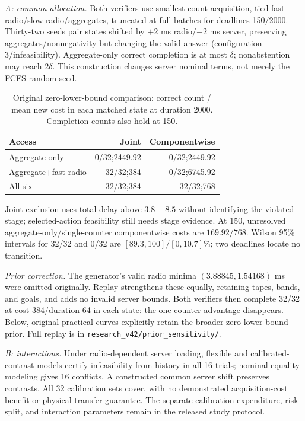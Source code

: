 \emph{A: common allocation.} Both verifiers use smallest-count acquisition, tied fast radio/slow radio/aggregates, truncated at full batches for deadlines 150/2000. Thirty-two seeds pair states shifted by $+2$ ms radio/$-2$ ms server, preserving aggregates/nonnegativity but changing the valid answer (configuration 3/infeasibility). Aggregate-only correct completion is at most $\delta$; nonabstention may reach $2\delta$. This construction changes server nominal terms, not merely the FCFS random seed.
\begin{table}[t]
\centering\small
\caption{Original zero-lower-bound comparison: correct count / mean new cost in each matched state at duration 2000. Completion counts also hold at 150.}
\label{tab:v41-capability}
\begin{tabular}{@{}lrr@{}}
\toprule
Access&Joint&Componentwise\\
\midrule
Aggregate only&0/32;2449.92&0/32;2449.92\\
Aggregate+fast radio&32/32;384&0/32;6745.92\\
All six&32/32;384&32/32;768\\
\bottomrule
\end{tabular}
\end{table}
Joint exclusion uses total delay above $3.8+8.5$ without identifying the violated stage; selected-action feasibility still needs stage evidence. At 150, unresolved aggregate-only/single-counter componentwise costs are $169.92/768$. Wilson 95\% intervals for 32/32 and 0/32 are $[89.3,100]/[0,10.7]\%$; two deadlines locate no transition.

\label{app:prior-sensitivity}
\emph{Prior correction.} The generator's valid radio minima $(3.88845,1.54168)$ ms were omitted originally. Replay strengthens these equally, retaining tapes, bands, and goals, and adds no invalid server bounds. Both verifiers then complete 32/32 at cost 384/duration 64 in each state: the one-counter advantage disappears. Below, original practical curves explicitly retain the broader zero-lower-bound prior. Full replay is in \texttt{research\_v42/prior\_sensitivity/}.

\emph{B: interactions.} Under radio-dependent server loading, flexible and calibrated-contrast models certify infeasibility from history in all 16 trials; nominal-equality modeling gives 16 conflicts. A constructed common server shift preserves contrasts. All 32 calibration sets cover, with no demonstrated acquisition-cost benefit or physical-transfer guarantee. The separate calibration expenditure, risk split, and interaction parameters remain in the released study protocol.

